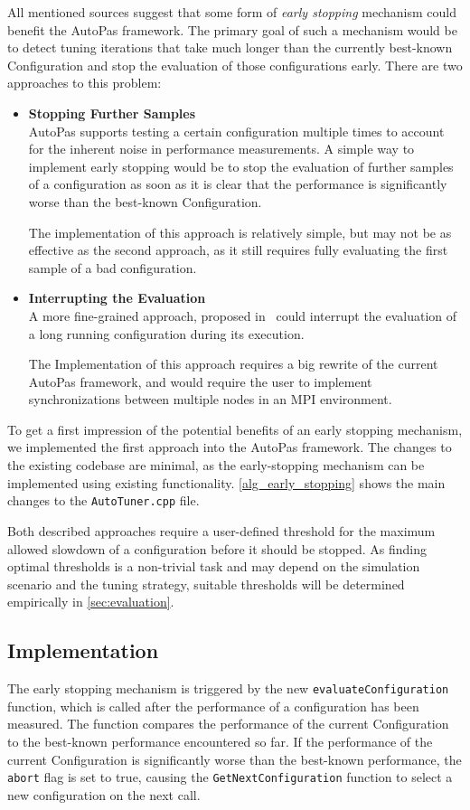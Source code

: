 \documentclass[conference]{IEEEtran}
\begin{document}
All mentioned sources suggest that some form of \textit{early stopping} mechanism could benefit the AutoPas framework. The primary goal of such a mechanism would be to detect tuning iterations that take much longer than the currently best-known Configuration and stop the evaluation of those configurations early. There are two approaches to this problem:

\begin{itemize}
    \item \textbf{Stopping Further Samples}\\
          AutoPas supports testing a certain configuration multiple times to account for the inherent noise in performance measurements. A simple way to implement early stopping would be to stop the evaluation of further samples of a configuration as soon as it is clear that the performance is significantly worse than the best-known Configuration.

          The implementation of this approach is relatively simple, but may not be as effective as the second approach, as it still requires fully evaluating the first sample of a bad configuration.
    \item \textbf{Interrupting the Evaluation}\\
          A more fine-grained approach, proposed in~\cite{endreport.pdf} could interrupt the evaluation of a long running configuration during its execution.

          The Implementation of this approach requires a big rewrite of the current AutoPas framework, and would require the user to implement synchronizations between multiple nodes in an MPI environment.
\end{itemize}

To get a first impression of the potential benefits of an early stopping mechanism, we implemented the first approach into the AutoPas framework. The changes to the existing codebase are minimal, as the early-stopping mechanism can be implemented using existing functionality. \autoref{alg_early_stopping} shows the main changes to the \texttt{AutoTuner.cpp} file.

Both described approaches require a user-defined threshold for the maximum allowed slowdown of a configuration before it should be stopped. As finding optimal thresholds is a non-trivial task and may depend on the simulation scenario and the tuning strategy, suitable thresholds will be determined empirically in \autoref{sec:evaluation}.

\subsection{Implementation}
The early stopping mechanism is triggered by the new \texttt{evaluateConfiguration} function, which is called after the performance of a configuration has been measured. The function compares the performance of the current Configuration to the best-known performance encountered so far. If the performance of the current Configuration is significantly worse than the best-known performance, the \texttt{abort} flag is set to true, causing the \texttt{GetNextConfiguration} function to select a new configuration on the next call.
\end{document}

